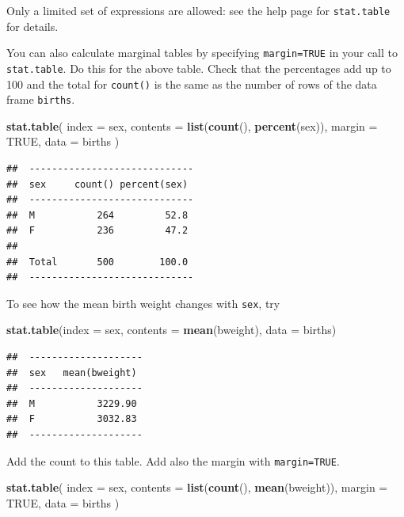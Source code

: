 \documentclass[
]{book}
\newenvironment{Shaded}{\begin{snugshade}}{\end{snugshade}}
\newcommand{\AttributeTok}[1]{\textcolor[rgb]{0.13,0.29,0.53}{#1}}
\newcommand{\ConstantTok}[1]{\textcolor[rgb]{0.56,0.35,0.01}{#1}}
\newcommand{\FunctionTok}[1]{\textcolor[rgb]{0.13,0.29,0.53}{\textbf{#1}}}
\newcommand{\NormalTok}[1]{#1}
\theoremstyle{definition}
\theoremstyle{definition}
\theoremstyle{definition}
\theoremstyle{definition}
\theoremstyle{remark}
\begin{document}
Only a limited set of expressions are allowed: see the help page
for \texttt{stat.table} for details.

You can also calculate marginal tables by specifying \texttt{margin=TRUE}
in your call to \texttt{stat.table}. Do this for the above table. Check
that the percentages add up to 100 and the total for \texttt{count()} is the
same as the number of rows of the data frame \texttt{births}.

\begin{Shaded}
\begin{Highlighting}[]
\FunctionTok{stat.table}\NormalTok{(}
  \AttributeTok{index =}\NormalTok{ sex, }\AttributeTok{contents =} \FunctionTok{list}\NormalTok{(}\FunctionTok{count}\NormalTok{(), }\FunctionTok{percent}\NormalTok{(sex)),}
  \AttributeTok{margin =} \ConstantTok{TRUE}\NormalTok{, }\AttributeTok{data =}\NormalTok{ births}
\NormalTok{)}
\end{Highlighting}
\end{Shaded}

\begin{verbatim}
##  ----------------------------- 
##  sex     count() percent(sex)  
##  ----------------------------- 
##  M           264         52.8  
##  F           236         47.2  
##                                
##  Total       500        100.0  
##  -----------------------------
\end{verbatim}

To see how the mean birth weight changes with \texttt{sex}, try

\begin{Shaded}
\begin{Highlighting}[]
\FunctionTok{stat.table}\NormalTok{(}\AttributeTok{index =}\NormalTok{ sex, }\AttributeTok{contents =} \FunctionTok{mean}\NormalTok{(bweight), }\AttributeTok{data =}\NormalTok{ births)}
\end{Highlighting}
\end{Shaded}

\begin{verbatim}
##  -------------------- 
##  sex   mean(bweight)  
##  -------------------- 
##  M           3229.90  
##  F           3032.83  
##  --------------------
\end{verbatim}

Add the count to this table. Add also the margin with \texttt{margin=TRUE}.

\begin{Shaded}
\begin{Highlighting}[]
\FunctionTok{stat.table}\NormalTok{(}
  \AttributeTok{index =}\NormalTok{ sex, }\AttributeTok{contents =} \FunctionTok{list}\NormalTok{(}\FunctionTok{count}\NormalTok{(), }\FunctionTok{mean}\NormalTok{(bweight)),}
  \AttributeTok{margin =} \ConstantTok{TRUE}\NormalTok{, }\AttributeTok{data =}\NormalTok{ births}
\NormalTok{)}
\end{Highlighting}
\end{Shaded}
\end{document}

